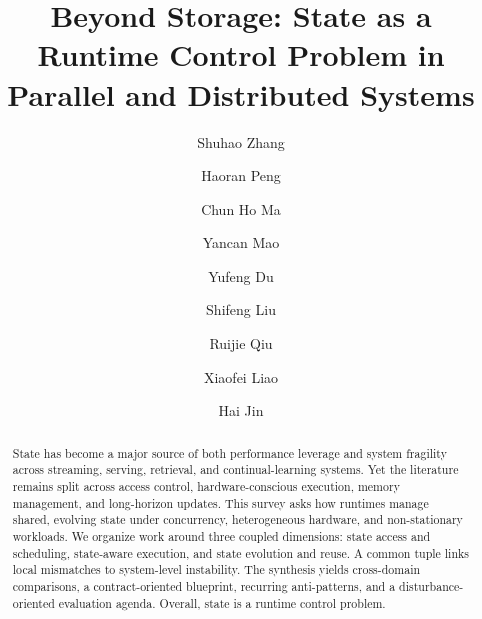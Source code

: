 ﻿\documentclass[manuscript]{acmart}
\begin{document}
\title{Beyond Storage: State as a Runtime Control Problem in Parallel and Distributed Systems}

\author{Shuhao Zhang}

\author{Haoran Peng}

\author{Chun Ho Ma}

\author{Yancan Mao}

\author{Yufeng Du}

\author{Shifeng Liu}

\author{Ruijie Qiu}

\author{Xiaofei Liao}

\author{Hai Jin}

\begin{abstract}
State has become a major source of both performance leverage and system fragility across streaming, serving, retrieval, and continual-learning systems. Yet the literature remains split across access control, hardware-conscious execution, memory management, and long-horizon updates. This survey asks how runtimes manage shared, evolving state under concurrency, heterogeneous hardware, and non-stationary workloads. We organize work around three coupled dimensions: state access and scheduling, state-aware execution, and state evolution and reuse. A common tuple links local mismatches to system-level instability. The synthesis yields cross-domain comparisons, a contract-oriented blueprint, recurring anti-patterns, and a disturbance-oriented evaluation agenda. Overall, state is a runtime control problem.
\end{abstract}
\end{document}

